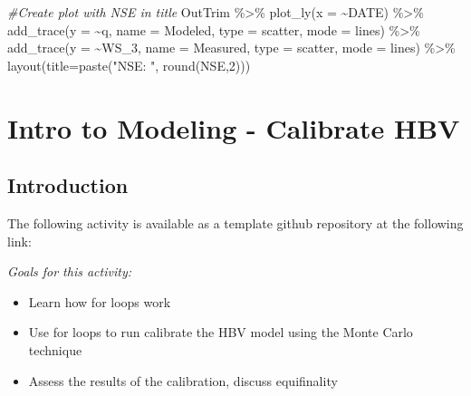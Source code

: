 \documentclass[
]{book}
\newenvironment{Shaded}{\begin{snugshade}}{\end{snugshade}}
\newcommand{\AttributeTok}[1]{\textcolor[rgb]{0.77,0.63,0.00}{#1}}
\newcommand{\CommentTok}[1]{\textcolor[rgb]{0.56,0.35,0.01}{\textit{#1}}}
\newcommand{\DecValTok}[1]{\textcolor[rgb]{0.00,0.00,0.81}{#1}}
\newcommand{\FunctionTok}[1]{\textcolor[rgb]{0.00,0.00,0.00}{#1}}
\newcommand{\NormalTok}[1]{#1}
\newcommand{\SpecialCharTok}[1]{\textcolor[rgb]{0.00,0.00,0.00}{#1}}
\newcommand{\StringTok}[1]{\textcolor[rgb]{0.31,0.60,0.02}{#1}}
\providecommand{\tightlist}{%
  \setlength{\itemsep}{0pt}\setlength{\parskip}{0pt}}
\begin{document}
\begin{Shaded}
\begin{Highlighting}[]
\CommentTok{\#Create plot with NSE in title}
\NormalTok{OutTrim }\SpecialCharTok{\%\textgreater{}\%} \FunctionTok{plot\_ly}\NormalTok{(}\AttributeTok{x =} \SpecialCharTok{\textasciitilde{}}\NormalTok{DATE) }\SpecialCharTok{\%\textgreater{}\%} 
        \FunctionTok{add\_trace}\NormalTok{(}\AttributeTok{y =} \SpecialCharTok{\textasciitilde{}}\NormalTok{q, }\AttributeTok{name =} \StringTok{\textquotesingle{}Modeled\textquotesingle{}}\NormalTok{,  }\AttributeTok{type =} \StringTok{\textquotesingle{}scatter\textquotesingle{}}\NormalTok{, }\AttributeTok{mode =} \StringTok{\textquotesingle{}lines\textquotesingle{}}\NormalTok{) }\SpecialCharTok{\%\textgreater{}\%} 
        \FunctionTok{add\_trace}\NormalTok{(}\AttributeTok{y =} \SpecialCharTok{\textasciitilde{}}\NormalTok{WS\_3, }\AttributeTok{name =} \StringTok{\textquotesingle{}Measured\textquotesingle{}}\NormalTok{, }\AttributeTok{type =} \StringTok{\textquotesingle{}scatter\textquotesingle{}}\NormalTok{, }\AttributeTok{mode =} \StringTok{\textquotesingle{}lines\textquotesingle{}}\NormalTok{) }\SpecialCharTok{\%\textgreater{}\%} 
        \FunctionTok{layout}\NormalTok{(}\AttributeTok{title=}\FunctionTok{paste}\NormalTok{(}\StringTok{"NSE: "}\NormalTok{, }\FunctionTok{round}\NormalTok{(NSE,}\DecValTok{2}\NormalTok{)))}
\end{Highlighting}
\end{Shaded}

\hypertarget{modelingcalibration}{%
\chapter{Intro to Modeling - Calibrate HBV}\label{modelingcalibration}}

\hypertarget{introduction-6}{%
\section{Introduction}\label{introduction-6}}

The following activity is available as a template github repository at the following link:

\emph{Goals for this activity:}

\begin{itemize}
\tightlist
\item
  Learn how for loops work
\item
  Use for loops to run calibrate the HBV model using the Monte Carlo technique
\item
  Assess the results of the calibration, discuss equifinality
\end{itemize}
\end{document}
